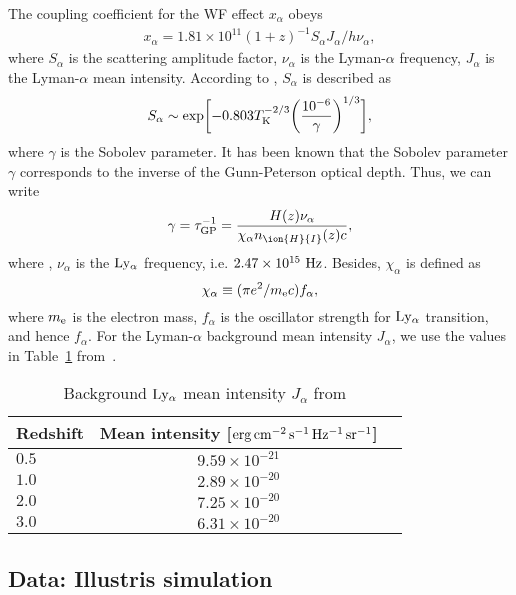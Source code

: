 \documentclass[a4paper,fleqn,usenatbib,useAMS]{mnras}
\begin{document}
The coupling coefficient for the WF effect $x_{\alpha}$ obeys 
\begin{align}
	x_{\alpha}=1.81\times 10^{11} (1+z)^{-1} S_{\alpha} J_{\alpha}/h\nu_\alpha, 
\end{align}
where $S_{\alpha}$ is the scattering amplitude factor, $\nu_\alpha$ is
the Lyman-$\alpha$ frequency,  
$J_{\alpha}$ is the Lyman-$\alpha$ mean intensity. 
According to \citet{Furlanetto2006}, 
$S_{\alpha}$ is described as 
\begin{align}
	S_{\alpha} \sim \exp \biggl[ -0.803 T_{\rm{K}}^{-2/3} \biggl( \frac{10^{-6}}{\gamma} \biggl)^{1/3} \biggl], 
\end{align}
where $\gamma$ is the Sobolev parameter.
It has been known that the Sobolev parameter $\gamma$ corresponds to the inverse of the Gunn-Peterson optical depth.
Thus, we can write  
\begin{align}
	\gamma =\tau_{\rm{GP}}^{-1}=\frac{H(z)\nu_{\alpha}}{\chi_{\alpha}n_{\ion{H}{I}}(z)c}, 
\end{align}
where , $\nu_{\alpha}$ is the $\rm Ly_{\alpha}$ frequency, i.e. $2.47\times 10^{15}~\rm{Hz}$. 
Besides, $\chi_{\alpha}$ is defined as 
\begin{equation}
	\chi_{\alpha}\equiv (\pi e^{2}/m_{\rm{e}}c)f_{\alpha},
\end{equation}
where $m_{\rm e}$ is the electron mass, $f_{\alpha}$ is the oscillator strength for $\rm Ly_{\alpha}$ transition, and hence $f_{\alpha}$. 
For the Lyman-$\alpha$ background mean intensity $J_{\alpha}$, 
we use the values in Table~\ref{tab:mean intensity} from~\citet{HM2012}.


\begin{table}
\caption{Background $\rm Ly_{\alpha}$ mean intensity $J_{\alpha}$ from \citet{HM2012}}
\label{tab:mean intensity}
\begin{tabular}{lcc}
\hline
Redshift & Mean intensity [$\rm{erg}\,\rm{cm^{-2}\, s^{-1}\, Hz^{-1}\, sr^{-1} }$]\\
\hline
$0.5$ & $9.59\times10^{-21}$\\
$1.0$ & $2.89\times10^{-20}$\\
$2.0$ & $7.25\times10^{-20}$\\
$3.0$ & $6.31\times10^{-20}$\\
\hline
\end{tabular}
\label{tab:mean intensity}
\end{table}

\subsection{Data: Illustris simulation}\label{Illustris simulation}
\end{document}
